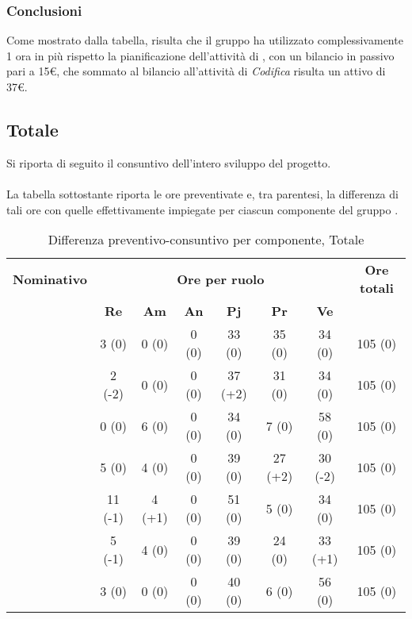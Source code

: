 \subsubsection{Conclusioni}
Come mostrato dalla tabella, risulta che il gruppo ha utilizzato complessivamente 1 ora in più rispetto la pianificazione dell'attività di \textit{\VV}, con un bilancio in passivo pari a 15€, che sommato al bilancio all'attività di \textit{Codifica} risulta un attivo di 37€.

\newpage
\subsection{Totale}

Si riporta di seguito il consuntivo dell'intero sviluppo del progetto. \\
\\
La tabella sottostante riporta le ore preventivate e, tra parentesi, la differenza di tali ore con quelle effettivamente impiegate per ciascun componente del gruppo \gruppo.

\begin{table}[H]
	\begin{center}
		\begin{tabular}{|c|c|c|c|c|c|c|c|}
			\hline
			\textbf{Nominativo} & \multicolumn{6}{c|}{\textbf{Ore per ruolo}} & \textbf{Ore totali} \\
			& \textbf{Re} & \textbf{Am} & \textbf{An} & \textbf{Pj} & \textbf{Pr} & \textbf{Ve} & \\
			\hline
			\FB			&	3 (0)		&	0 (0)		&	0 (0)	 	&	33 (0)		&	35 (0)		&	34 (0)		&	105 (0)				\\
			\hline
			\AF			&	2 (-2)		&	0 (0)		&	0 (0)		&	37 (+2)		&	31 (0)		&	34 (0)		& 	105 (0)				\\
			\hline		
			\GN			&	0 (0)		&	6 (0)		&	0 (0)		&	34 (0)		&	7 (0)		&	58	(0)		&	105 (0)				\\
			\hline
			\GR			&	5 (0)		&	4 (0) 		&	0 (0)		&	39 (0)		&	27 (+2)		& 	30	(-2)	&	105 (0)				\\
			\hline
			\SM 		&	11 (-1)		&	4 (+1)		&	0 (0)		&	51 (0)		&	5 (0)		& 	34 (0)		&	105 (0)				\\
			\hline
			\MP 		& 	5 (-1)		&	4 (0)		&	0 (0)		&	39 (0)		&	24 (0)		&	33	(+1)	&	105 (0)				\\
			\hline
			\MV 		&	3 (0)		&	0 (0)		&	0 (0)		&	40 (0)		&	6 (0)		&	56	(0)		& 	105 (0)				\\
			\hline
		\end{tabular}
	\end{center}
	\caption{Differenza preventivo-consuntivo per componente, Totale}
\end{table}

